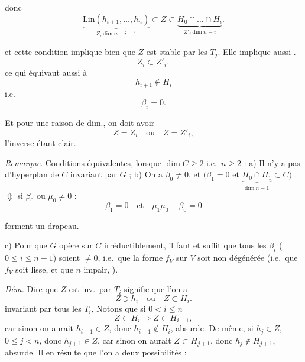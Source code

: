 \documentclass[11pt,a4paper]{article}
\begin{document}
donc
\[
\underbrace{\mathrm{Lin}(h_{i+1}, \dots, h_n)}_{Z_i \ \mathrm{dim}\ n-i-1} \subset Z \subset \underbrace{H_0 \cap \dots \cap H_i}_{Z'_i \ \mathrm{dim}\ n-i} .
\]

et  cette condition implique bien que $Z$ est stable par les $T_j$. Elle implique aussi .
\[
Z_i \subset Z'_i ,
\]
ce qui équivaut aussi à
\[
h_{i+1} \notin H_i
\]
i.e.
\[
\beta_i = 0 .
\]


Et pour une raison de dim., on doit avoir
\[
Z = Z_i \quad \text{ou} \quad Z = Z'_i ,
\]
l'inverse étant clair.

\emph{Remarque}. Conditions équivalentes, lorsque $\dim C \geq 2$ i.e.\ $n \geq 2$ : a) Il n'y a pas d'hyperplan de $C$ invariant par $G$ ; b) On a \struck{\ill{}} $\beta_0 \neq 0$, et \struck{\ill{}}  $\bigl(\beta_1 = 0$ et $\underbrace{H_0 \cap H_1}_{\mathrm{dim}\ n-1} \subset C\bigr)$ .
$\Updownarrow$ si $\beta_0$ ou $\mu_0 \neq 0$ :
\[
\beta_1 = 0 \quad \text{et} \quad \mu_1 \mu_0 - \beta_0 = 0
\]

\ill{} forment un drapeau.

c) Pour que $G$ opère sur $C$ \ill{} irréductiblement, il faut et suffit que tous les $\beta_i$ ($0 \leq i \leq n-1$) soient $\neq 0$, i.e.\ que la forme   $f_V$ sur $V$ soit  non dégénérée (i.e.\ que $f_V$ soit lisse, et que   $n$ impair,  ).


\emph{Dém.} Dire que $Z$ est inv.\ par $T_i$ signifie que l'on a
\[
Z \ni h_i \quad \text{ou} \quad Z \subset H_i .
\]
 \add{\ill{}} invariant par tous les $T_i$,  Notons que si $0 < i \leq n$
\[
Z \subset H_i \Longrightarrow Z \subset H_{i-1} ,
\]
car sinon on aurait $h_{i-1} \in Z$, donc $h_{i-1} \notin H_i$, absurde. De même, si $h_j \in Z$,  $0 \leq j < n$, donc $h_{j+1} \in Z$, car sinon on aurait $Z \subset H_{j+1}$, donc $h_j \notin H_{j+1}$, absurde.
Il en résulte que l'on a deux possibilités \struck{\ill{}} :
\end{document}
